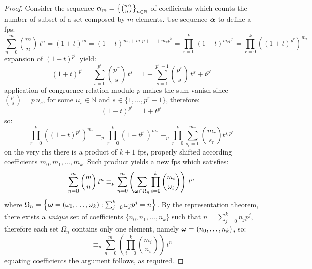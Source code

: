 \begin{proof}
    Consider the sequence $\boldsymbol{\alpha}_{m}=\left\lbrace{{m}\choose{n}}\right\rbrace_{n\in\mathbb{N}}$ 
    of coefficients which counts the number of subset
    of a set composed by $m$ elements. Use sequence $\boldsymbol{\alpha}$ to define a \ac{fps}:
    \begin{displaymath}
        \sum_{n=0}^{m}{{{m}\choose{n}}\,t^{n}} = \left(1+t\right)^{m}
            = \left(1+t\right)^{m_{0}+m_{1}p+\ldots+m_{k}p^{k}}
            = \prod_{r=0}^{k}{{\left(1+t\right)^{m_{r}p^{r}}}}
            = \prod_{r=0}^{k}{\left(\left(1+t\right)^{p^{r}}\right)^{m_{r}}}
    \end{displaymath}
    expansion of $\left(1+t\right)^{p^{r}}$ yield: 
    \begin{displaymath}
            \left(1+t\right)^{p^{r}} = \sum_{s=0}^{p^{r}}{{{p^{r}}\choose{s}}\,t^{s}}
                = 1+\sum_{s=1}^{p^{r}-1}{{{p^{r}}\choose{s}}\,t^{s}}+t^{p^{r}}
    \end{displaymath}
    application of congruence relation modulo $p$ makes the sum vanish since ${{p^{r}}\choose{s}}=p\,u_{s}$,
    for some $u_{s}\in\mathbb{N}$ and $s\in\lbrace 1,\ldots,p^{r}-1\rbrace$, therefore:
    \begin{displaymath}
        \left(1+t\right)^{p^{r}} = 1+t^{p^{r}}
    \end{displaymath}
    so:
    \begin{displaymath}
        \prod_{r=0}^{k}{\left(\left(1+t\right)^{p^{r}}\right)^{m_{r}}}
            \equiv_{p} \prod_{r=0}^{k}{\left(1+t^{p^{r}}\right)^{m_{r}}}
            \equiv_{p} \prod_{r=0}^{k}{\sum_{s_{r}=0}^{m_{r}}{{{m_{r}}\choose{s_{r}}}t^{s_{r}p^{r}}}}
    \end{displaymath}
    on the very \ac{rhs} there is a product of $k+1$ \ac{fps}, properly shifted according coefficients
    $m_{0},m_{1},\ldots,m_{k}$. Such product yields a new \ac{fps} which satisfies:
    \begin{displaymath}
        \sum_{n=0}^{m}{{{m}\choose{n}}\,t^{n}} 
        \equiv_{p}
        \sum_{n=0}^{m}{\left(\sum_{\boldsymbol{\omega}\in\Omega_{n}}{\prod_{i=0}^{k}{{{m_{i}}\choose{\omega_{i}}}}}\right)\,t^{n}}
    \end{displaymath}
    where $\Omega_{n}=\left\lbrace\boldsymbol{\omega}=\left(\omega_{0},\ldots,\omega_{k}\right):
        \sum_{j=0}^{k}{\omega_{j}p^{j}}=n\right\rbrace$.
    By the representation theorem, there exists a \emph{unique} set of coefficients
    $\lbrace n_{0},n_{1},\ldots,n_{k}\rbrace$ such that $n=\sum_{j=0}^{k}{n_{j}p^{j}}$, therefore
    each set $\Omega_{n}$ contains only one element, namely $\boldsymbol{\omega}=(n_{0},\ldots,n_{k})$, so:
    \begin{displaymath}
        \equiv_{p} \sum_{n=0}^{m}{\left({\prod_{i=0}^{k}{{{m_{i}}\choose{n_{i}}}}}\right)\,t^{n}}
    \end{displaymath}
    equating coefficients the argument follows, as required.

\end{proof}

